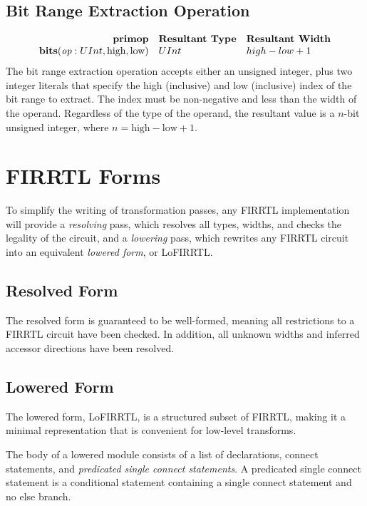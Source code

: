 \documentclass[12pt]{article}
\begin{document}
\subsection{Bit Range Extraction Operation}
\[
\begin{array}{rll}
\text{\bf primop} & \text{\bf Resultant Type} & \text{\bf Resultant Width} \\
\text{\bf bits}(\text{\em op}:UInt, \text{high}, \text{low})  & UInt & high - low + 1    \\
\end{array}
\]
The bit range extraction operation accepts either an unsigned integer, plus two integer literals that specify the high (inclusive) and low (inclusive) index of the bit range to extract.
The index must be non-negative and less than the width of the operand.
Regardless of the type of the operand, the resultant value is a $n$-bit unsigned integer, where $n = \text{high} - \text{low} + 1$. 

\section{FIRRTL Forms}

To simplify the writing of transformation passes, any FIRRTL implementation will provide a {\em resolving} pass, which resolves all types, widths, and checks the legality of the circuit, and a {\em lowering} pass, which rewrites any FIRRTL circuit into an equivalent {\em lowered form}, or LoFIRRTL.

\subsection{Resolved Form}

The resolved form is guaranteed to be well-formed, meaning all restrictions to a FIRRTL circuit have been checked. In addition, all unknown widths and inferred accessor directions have been resolved.

\subsection{Lowered Form}

The lowered form, LoFIRRTL, is a structured subset of FIRRTL, making it a minimal representation that is convenient for low-level transforms. 

The body of a lowered module consists of a list of declarations, connect statements, and {\em predicated single connect statements}.
A predicated single connect statement is a conditional statement containing a single connect statement and no else branch.
\end{document}
